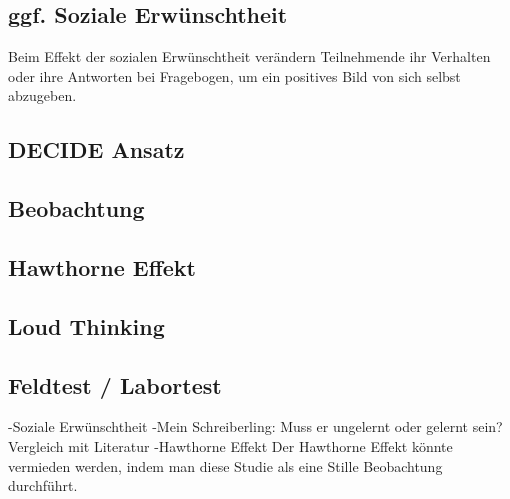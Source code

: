 \subsection{ggf. Soziale Erwünschtheit}
\grqq{} Beim Effekt der sozialen Erwünschtheit verändern Teilnehmende ihr Verhalten oder ihre Antworten bei Fragebogen, um ein positives Bild von sich selbst abzugeben.\glqq 

\subsection{DECIDE Ansatz}
\subsection{Beobachtung}
\subsection{Hawthorne Effekt}
\subsection{Loud Thinking}
\subsection{Feldtest / Labortest}

-Soziale Erwünschtheit
-Mein Schreiberling: Muss er ungelernt oder gelernt sein? Vergleich mit Literatur
-Hawthorne Effekt
Der Hawthorne Effekt könnte vermieden werden, indem man diese Studie als eine Stille Beobachtung durchführt. 
%

